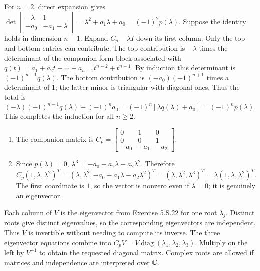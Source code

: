 For $n=2$, direct expansion gives
$\det\begin{bmatrix}-\lambda&1\\-a_0&-a_1-\lambda\end{bmatrix}
=\lambda^2+a_1\lambda+a_0=(-1)^2p(\lambda)$.
Suppose the identity holds in dimension $n-1$.
Expand $C_p-\lambda I$ down its first column. Only the top and
bottom entries can contribute. The top contribution is $-\lambda$
times the determinant of the companion-form block associated with
$q(t)=a_1+a_2t+\cdots+a_{n-1}t^{n-2}+t^{n-1}$.
By induction this determinant is $(-1)^{n-1}q(\lambda)$.
The bottom contribution is $(-a_0)(-1)^{n+1}$ times a determinant
of $1$; the latter minor is triangular with diagonal ones.
Thus the total is
\[(-\lambda)(-1)^{n-1}q(\lambda)+(-1)^na_0
=(-1)^n[\lambda q(\lambda)+a_0]=(-1)^np(\lambda).\]
This completes the induction for all $n\ge2$.

\begin{enumerate}[label=(\alph*)]
\item The companion matrix is
$C_p=\begin{bmatrix}0&1&0\\0&0&1\\-a_0&-a_1&-a_2\end{bmatrix}$.
\item Since $p(\lambda)=0$,
$\lambda^3=-a_0-a_1\lambda-a_2\lambda^2$. Therefore
\[C_p(1,\lambda,\lambda^2)^T
=(\lambda,\lambda^2,-a_0-a_1\lambda-a_2\lambda^2)^T
=(\lambda,\lambda^2,\lambda^3)^T
=\lambda(1,\lambda,\lambda^2)^T.\]
The first coordinate is $1$, so the vector is nonzero even if
$\lambda=0$; it is genuinely an eigenvector.
\end{enumerate}

Each column of $V$ is the eigenvector from Exercise 5.S.22 for
one root $\lambda_j$. Distinct roots give distinct eigenvalues,
so the corresponding eigenvectors are independent. Thus $V$ is
invertible without needing to compute its inverse.
The three eigenvector equations combine into
$C_pV=V\operatorname{diag}(\lambda_1,\lambda_2,\lambda_3)$.
Multiply on the left by $V^{-1}$ to obtain the requested diagonal
matrix. Complex roots are allowed if matrices and independence are
interpreted over $\mathbb{C}$.

